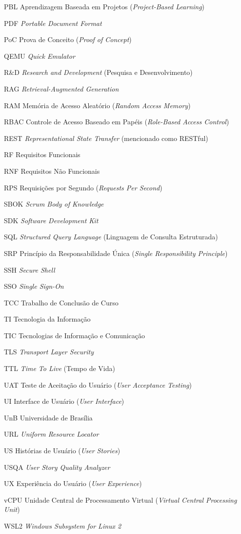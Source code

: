 \begin{siglas}
  \item[PBL] Aprendizagem Baseada em Projetos (\textit{Project-Based Learning})
  \item[PDF] \textit{Portable Document Format}
  \item[PoC] Prova de Conceito (\textit{Proof of Concept})
  \item[QEMU] \textit{Quick Emulator}
  \item[R\&D] \textit{Research and Development} (Pesquisa e Desenvolvimento)
  \item[RAG] \textit{Retrieval-Augmented Generation}
  \item[RAM] Memória de Acesso Aleatório (\textit{Random Access Memory})
  \item[RBAC] Controle de Acesso Baseado em Papéis (\textit{Role-Based Access Control})
  \item[REST] \textit{Representational State Transfer} (mencionado como RESTful)
  \item[RF] Requisitos Funcionais
  \item[RNF] Requisitos Não Funcionais
  \item[RPS] Requisições por Segundo (\textit{Requests Per Second})
  \item[SBOK] \textit{Scrum Body of Knowledge}
  \item[SDK] \textit{Software Development Kit}
  \item[SQL] \textit{Structured Query Language} (Linguagem de Consulta Estruturada)
  \item[SRP] Princípio da Responsabilidade Única (\textit{Single Responsibility Principle})
  \item[SSH] \textit{Secure Shell}
  \item[SSO] \textit{Single Sign-On}
  \item[TCC] Trabalho de Conclusão de Curso
  \item[TI] Tecnologia da Informação
  \item[TIC] Tecnologias de Informação e Comunicação
  \item[TLS] \textit{Transport Layer Security}
  \item[TTL] \textit{Time To Live} (Tempo de Vida)
  \item[UAT] Teste de Aceitação do Usuário (\textit{User Acceptance Testing})
  \item[UI] Interface de Usuário (\textit{User Interface})
  \item[UnB] Universidade de Brasília
  \item[URL] \textit{Uniform Resource Locator}
  \item[US] Histórias de Usuário (\textit{User Stories})
  \item[USQA] \textit{User Story Quality Analyzer}
  \item[UX] Experiência do Usuário (\textit{User Experience})
  \item[vCPU] Unidade Central de Processamento Virtual (\textit{Virtual Central Processing Unit})
  \item[WSL2] \textit{Windows Subsystem for Linux 2}
\end{siglas}
